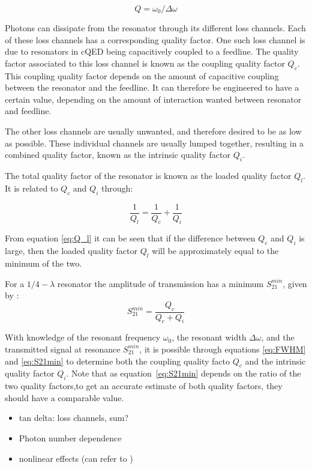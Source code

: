 \documentclass[12pt]{report}
\begin{document}
\begin{equation}
    Q = \omega_0 / \Delta \omega
    \label{eq:FWHM}
\end{equation}

Photons can dissipate from the resonator through its different loss channels. Each of these loss channels has a corresponding quality factor. One such loss channel is due to resonators in cQED being capacitively coupled to a feedline. The quality factor associated to this loss channel is known as the coupling quality factor $Q_c$. This coupling quality factor depends on the amount of capacitive coupling between the resonator and the feedline. It can therefore be engineered to have a certain value, depending on the amount of interaction wanted between resonator and feedline.

The other loss channels are usually unwanted, and therefore desired to be as low as possible. These individual channels are usually lumped together, resulting in a combined quality factor, known as the intrinsic quality factor $Q_i$.

The total quality factor of the resonator is known as the loaded quality factor $Q_l$. It is related to $Q_c$ and $Q_i$ through:

\begin{equation}
    \frac{1}{Q_l} = \frac{1}{Q_c} + \frac{1}{Q_i}
    \label{eq:Q_l}
\end{equation}

From equation \ref{eq:Q_l} it can be seen that if the difference between $Q_c$ and $Q_i$ is large, then the loaded quality factor $Q_l$ will be approximately equal to the minimum of the two.


For a $1/4 - \lambda$ resonator the amplitude of transmission has a minimum $S_{21}^{min}$, given by \cite[p.~29]{Mazin}:
\begin{equation}
    S_{21}^{min} = \frac{Q_c}{Q_c + Q_i}
    \label{eq:S21min}
\end{equation}

With knowledge of the resonant frequency $\omega_0$, the resonant width $\Delta \omega$, and the transmitted signal at resonance $S_{21}^{min}$, it is possible through equations \ref{eq:FWHM} and \ref{eq:S21min} to determine both the coupling quality facto $Q_c$ and the intrinsic quality factor $Q_i$. Note that as equation~\ref{eq:S21min} depends on the ratio of the two quality factors,to get an accurate estimate of both quality factors, they should have a comparable value.

\begin{itemize}
    \item tan delta: loss channels, sum?
    \item Photon number dependence
    \item nonlinear effects (can refer to \cite{abdo2006nonlinear})
\end{itemize}
\end{document}
